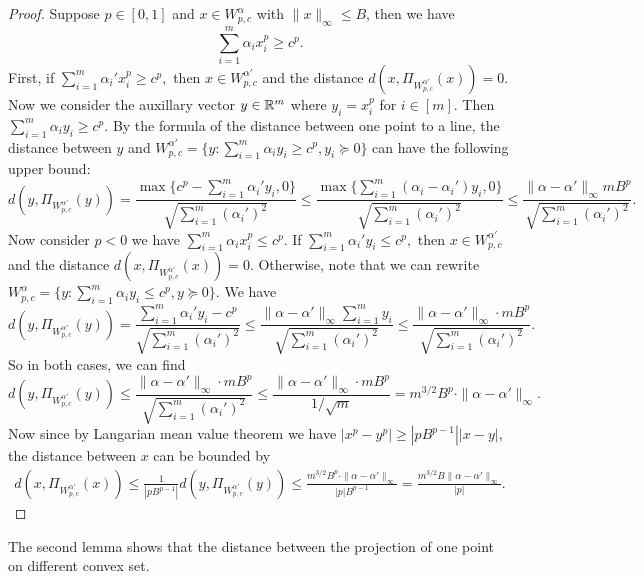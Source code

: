  \begin{proof}
     Suppose $p \in [0,1]$ and $x \in W_{p,c}^{\alpha}$ with $\|x\|_\infty \le B$, then we have 
     $$\sum_{i=1}^m \alpha_i x_i^p \ge c^p.$$
First, if $\sum_{i=1}^m \alpha_i' x_i^p \ge c^p,$ then $x \in W_{p,c}^{\alpha'}$ and the distance $d(x, \Pi_{W_{p,c}^{\alpha'}}(x))  = 0 .$
Now we consider the auxillary vector $y \in \mathbb{R}^m$ where $y_i = x_i^p$ for $i \in [m].$ Then $\sum_{i=1}^m \alpha_i y_i \ge c^p.$ By the formula of the distance between one point to a line, the distance between $y$ and $W_{p,c}^{\alpha'} = \{y: \sum_{i=1}^m \alpha_i y_i \ge c^p, y_i \succeq 0\}$ can have the following upper bound:
\begin{equation*}
    d(y, \Pi_{W_{p,c}^{\alpha'}}(y)) = \frac{\max\{c^p - \sum_{i=1}^m\alpha_i'y_i, 0\}}{\sqrt{\sum_{i=1}^m (\alpha_i')^2}} \le \frac{\max\{\sum_{i=1}^m (\alpha_i-\alpha_i')y_i,0\}}{\sqrt{\sum_{i=1}^m (\alpha_i')^2}}\le \frac{\|\alpha-\alpha'\|_\infty mB^p}{\sqrt{\sum_{i=1}^m (\alpha_i')^2}}.
\end{equation*}
Now consider $p<0$ we have $\sum_{i=1}^m \alpha_i x_i^p \le c^p.$ If $\sum_{i=1}^m\alpha_i' y_i \le c^p,$ then $x \in W_{p,c}^{\alpha'}$ and the distance $d(x, \Pi_{W_{p,c}^{\alpha'}}(x)) = 0.$ Otherwise, note that we can rewrite $W_{p,c}^{\alpha} = \{y:\sum_{i=1}^m \alpha_i y_i \le c^p, y\succeq 0\}.$ We have 
\begin{equation*}
    d(y, \Pi_{W_{p,c}^{\alpha'}}(y)) = \frac{\sum_{i=1}^m \alpha_i'y_i -c^p}{\sqrt{\sum_{i=1}^m (\alpha_i')^2}}\le \frac{\|\alpha-\alpha'\|_\infty \sum_{i=1}^m y_i}{\sqrt{\sum_{i=1}^m (\alpha_i')^2}}\le \frac{\|\alpha-\alpha'\|_\infty \cdot mB^p}{\sqrt{\sum_{i=1}^m (\alpha_i')^2}}.
\end{equation*}
So in both cases, we can find 
$$d(y, \Pi_{W_{p,c}^{\alpha'}}(y)) \le \frac{\|\alpha- \alpha'\|_\infty \cdot mB^p}{\sqrt{\sum_{i=1}^m (\alpha_i')^2}} \le \frac{\|\alpha- \alpha'\|_\infty \cdot mB^p}{1/\sqrt{m}} = m^{3/2}B^p \cdot \|\alpha-\alpha'\|_\infty.$$
Now since by Langarian mean value theorem we have $|x^p-y^p| \ge |pB^{p-1}||x-y|$, the distance between $x$ can be bounded by 
\begin{align*}
    d(x, \Pi_{W_{p,c}^{\alpha'}}(x)) \le \frac{1}{|pB^{p-1}|}d(y, \Pi_{W_{p,c}^{\alpha'}}(y)) \le \frac{m^{3/2}B^p \cdot \|\alpha-\alpha'\|_\infty}{|p|B^{p-1}}= \frac{m^{3/2}B\|\alpha-\alpha'\|_\infty}{|p|}.
\end{align*}
\end{proof}
The second lemma shows that the distance between the projection of one point on different convex set.
